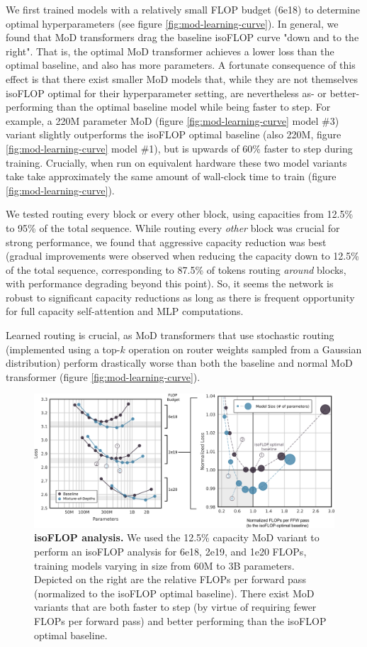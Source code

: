 \documentclass[11pt, a4paper, onecolumn, logo, copyright]{googledeepmind}
\begin{document}
We first trained models with a relatively small FLOP budget (6e18) to determine optimal hyperparameters (see figure  \ref{fig:mod-learning-curve}). In general, we found that MoD transformers drag the baseline isoFLOP curve "down and to the right". That is, the optimal MoD transformer achieves a lower loss than the optimal baseline, and also has more parameters. A fortunate consequence of this effect is that there exist smaller MoD models that, while they are not themselves isoFLOP optimal for their hyperparameter setting, are nevertheless as- or better-performing than the optimal baseline model while being faster to step. For example, a 220M parameter MoD (figure \ref{fig:mod-learning-curve} model \#3) variant slightly outperforms the isoFLOP optimal baseline (also 220M, figure \ref{fig:mod-learning-curve} model \#1), but is upwards of 60\% faster to step during training. Crucially, when run on equivalent hardware these two model variants take take approximately the same amount of wall-clock time to train (figure \ref{fig:mod-learning-curve}). 

We tested routing every block or every other block, using capacities from 12.5\% to 95\% of the total sequence. While routing every \textit{other} block was crucial for strong performance, we found that aggressive capacity reduction was best (gradual improvements were observed when reducing the capacity down to 12.5\% of the total sequence, corresponding to 87.5\% of tokens routing \textit{around} blocks, with performance degrading beyond this point). So, it seems the network is robust to significant capacity reductions as long as there is frequent opportunity for full capacity self-attention and MLP computations.

Learned routing is crucial, as MoD transformers that use stochastic routing (implemented using a top-$k$ operation on router weights sampled from a Gaussian distribution) perform drastically worse than both the baseline and normal MoD transformer (figure \ref{fig:mod-learning-curve}). 

\begin{figure}[h]
    \centering
    \includegraphics[width=\textwidth]{mod-isoflop.png}
    \caption{\textbf{isoFLOP analysis.} We used the 12.5\% capacity MoD variant to perform an isoFLOP analysis for 6e18, 2e19, and 1e20 FLOPs, training models varying in size from 60M to 3B parameters. Depicted on the right are the relative FLOPs per forward pass (normalized to the isoFLOP optimal baseline). There exist MoD variants that are both faster to step (by virtue of requiring fewer FLOPs per forward pass) and better performing than the isoFLOP optimal baseline.}
    \label{fig:isoflop}
\end{figure}
\end{document}
